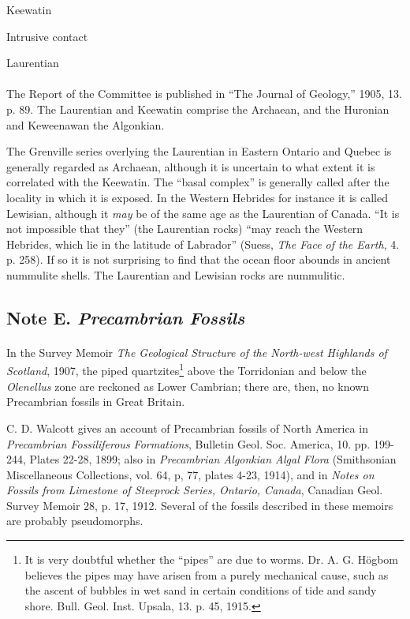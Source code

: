 \documentclass[a4paper, 12pt, oneside, landscape]{article}
\begin{document}
Keewatin

\hspace{10mm}Intrusive contact

Laurentian

\paragraph{}
The Report of the Committee is published in ``The Journal of Geology,'' 1905, 13. p. 89. The Laurentian and Keewatin comprise the Archaean, and the Huronian and Keweenawan the Algonkian.

The Grenville series overlying the Laurentian in Eastern Ontario and Quebec is generally regarded as Archaean, although it is uncertain to what extent it is correlated with the Keewatin. The ``basal complex'' is generally called after the locality in which it is exposed. In the Western Hebrides for instance it is called Lewisian, although it \emph{may} be of the same age as the Laurentian of Canada. ``It is not impossible that they'' (the Laurentian rocks) ``may reach the Western Hebrides, which lie in the latitude of Labrador'' (Suess, \emph{The Face of the Earth}, 4. p. 258). If so it is not surprising to find that the ocean floor abounds in ancient nummulite shells. The Laurentian and Lewisian rocks are nummulitic.

\subsection{Note E. \emph{Precambrian Fossils}}
\paragraph{}
In the Survey Memoir \emph{The Geological Structure of the North-west Highlands of Scotland}, 1907, the piped quartzites\footnote{It is very doubtful whether the ``pipes'' are due to worms. Dr. A. G. Högbom believes the pipes may have arisen from a purely mechanical cause, such as the ascent of bubbles in wet sand in certain conditions of tide and sandy shore. Bull. Geol. Inst. Upsala, 13. p. 45, 1915.} above the Torridonian and below the \emph{Olenellus} zone are reckoned as Lower Cambrian; there are, then, no known Precambrian fossils in Great Britain.

C. D. Walcott gives an account of Precambrian fossils of North America in \emph{Precambrian Fossiliferous Formations}, Bulletin Geol. Soc. America, 10. pp. 199-244, Plates 22-28, 1899; also in \emph{Precambrian Algonkian Algal Flora} (Smithsonian Miscellaneous Collections, vol. 64, p, 77, plates 4-23, 1914), and in \emph{Notes on Fossils from Limestone of Steeprock Series, Ontario, Canada}, Canadian Geol. Survey Memoir 28, p. 17, 1912. Several of the fossils described in these memoirs are probably pseudomorphs.
\end{document}
